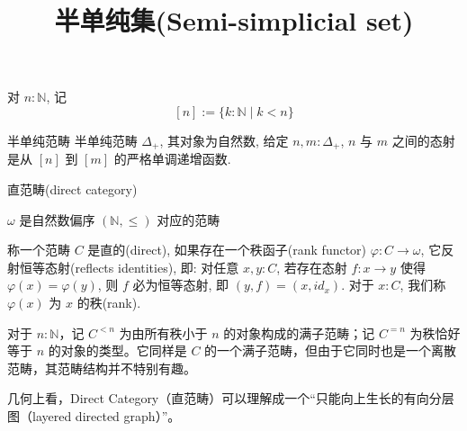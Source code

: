 \documentclass{beamer}
\title{半单纯集(Semi-simplicial set)}
\date{}
\newcommand{\bN}{\mathbb{N}}
\begin{document}
\begin{frame}
    \titlepage
\end{frame}

\begin{frame}
对 $n:\bN$, 记
\[
[n] := \{ k : \bN \mid k < n \}
\]
\end{frame}

\begin{frame}{半单纯范畴}
半单纯范畴 $\Delta_{+}$, 其对象为自然数, 给定 $n, m : \Delta_{+}$, $n$ 与 $m$ 之间的态射是从 $[n]$ 到 $[m]$ 的严格单调递增函数.
\end{frame}

\begin{frame}{直范畴(direct category)}

$ω$ 是自然数偏序 $(\mathbb{N},≤)$ 对应的范畴

\vspace{6mm}

称一个范畴 $C$ 是直的(direct), 如果存在一个秩函子(rank functor) $\varphi : C \to \omega$, 它反射恒等态射(reflects identities), 即: 对任意 $x,y:C$, 若存在态射 $f : x \to y$ 使得 $\varphi(x) = \varphi(y)$, 则 $f$ 必为恒等态射, 即 $(y,f) = (x,id_x)$. 对于 $x:C$, 我们称 $\varphi(x)$ 为 $x$ 的秩(rank).

\vspace{6mm}

对于 $n : \mathbb{N}$，记 $C^{<n}$ 为由所有秩小于 $n$ 的对象构成的满子范畴；记 $C^{=n}$ 为秩恰好等于 $n$ 的对象的类型。它同样是 $C$ 的一个满子范畴，但由于它同时也是一个离散范畴，其范畴结构并不特别有趣。

\vspace{6mm}

几何上看，Direct Category（直范畴）可以理解成一个“只能向上生长的有向分层图（layered directed graph）”。
\end{frame}
\end{document}
